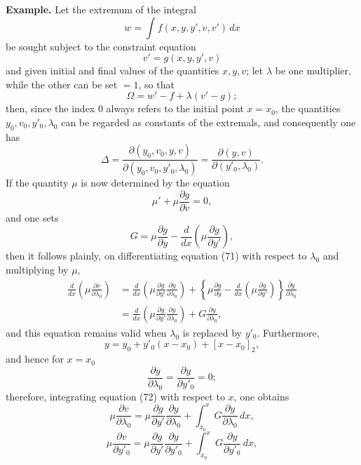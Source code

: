 \documentclass[11pt,a4paper,leqno]{article}
\begin{document}
\noindent\textbf{Example.} Let the extremum of the integral
\[
w=\int f(x,y,y',v,v')\,dx
\]
be sought subject to the constraint equation
\begin{equation}\tag{71}
v'=g(x,y,y',v)
\end{equation}
and given initial and final values of the quantities $x,y,v$;
let $\lambda$ be one multiplier, while the other can be set $=1$,
so that
\[
\Omega=w'-f+\lambda(v'-g);
\]
then, since the index 0 always refers to the initial
point $x=x_0$, the quantities $y_0,v_0,y'_0,\lambda_0$ can be regarded as constants
of the extremals, and consequently one has
\[
\Delta=
\frac{\partial(y_0,v_0,y,v)}{\partial(y_0,v_0,y'_0,\lambda_0)}
=\frac{\partial(y,v)}{\partial(y'_0,\lambda_0)}.
\]
If the quantity $\mu$ is now determined by the equation
\[
\mu'+\mu\frac{\partial g}{\partial v}=0,
\]
and one sets
\[
G=\mu\frac{\partial g}{\partial y}
-\frac{d}{dx}\left(\mu\frac{\partial g}{\partial y'}\right),
\]
then it follows plainly, on differentiating equation (71) with respect to $\lambda_0$
and multiplying by $\mu$,
\begin{equation}\tag{72}
\begin{aligned}
\frac{d}{dx}\left(\mu\frac{\partial v}{\partial\lambda_0}\right)
&=\frac{d}{dx}\left(\mu\frac{\partial g}{\partial y'}
\frac{\partial y}{\partial\lambda_0}\right)
+\left\{\mu\frac{\partial g}{\partial y}
-\frac{d}{dx}\left(\mu\frac{\partial g}{\partial y'}\right)\right\}
\frac{\partial y}{\partial\lambda_0}\\
&=\frac{d}{dx}\left(\mu\frac{\partial g}{\partial y'}
\frac{\partial y}{\partial\lambda_0}\right)
+G\frac{\partial y}{\partial\lambda_0},
\end{aligned}
\end{equation}
and this equation remains valid when $\lambda_0$ is replaced by $y'_0$.
Furthermore,
\begin{equation}\tag{73}
y=y_0+y'_0(x-x_0)+[x-x_0]_2,
\end{equation}
and hence for $x=x_0$
\[
\frac{\partial y}{\partial\lambda_0}
=\frac{\partial y}{\partial y'_0}=0;
\]
therefore, integrating equation (72) with respect to $x$, one obtains
\[
\mu\frac{\partial v}{\partial\lambda_0}
=\mu\frac{\partial g}{\partial y'}\frac{\partial y}{\partial\lambda_0}
+\int_{x_0}^{x}G\frac{\partial y}{\partial\lambda_0}\,dx,
\]
\[
\mu\frac{\partial v}{\partial y'_0}
=\mu\frac{\partial g}{\partial y'}\frac{\partial y}{\partial y'_0}
+\int_{x_0}^{x}G\frac{\partial y}{\partial y'_0}\,dx,
\]
\end{document}

